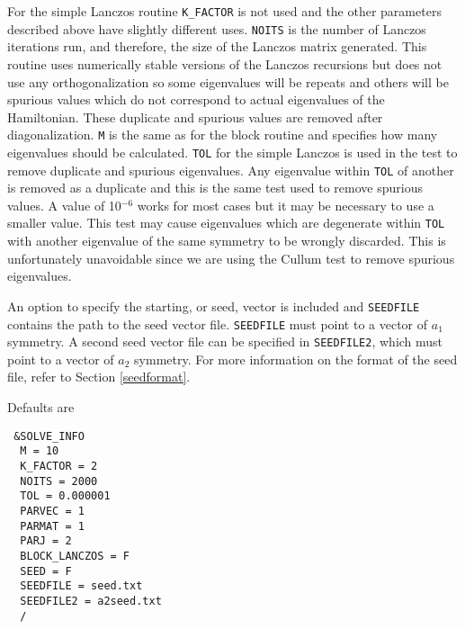 \documentclass{article}
\begin{document}
For the simple Lanczos routine {\tt K\_FACTOR} is not used and the other parameters described above
have slightly different uses. {\tt NOITS} is the number of Lanczos iterations run, and therefore, the
size of the Lanczos matrix generated. This routine uses numerically stable versions of the Lanczos recursions\cite{cullum} but does not use any orthogonalization so some
eigenvalues will be repeats and others will be spurious values which do not correspond to actual
eigenvalues of the Hamiltonian. These duplicate and spurious values are removed after diagonalization. {\tt M} is the same as for the block routine and specifies how many eigenvalues should be calculated. {\tt TOL} for the simple Lanczos is used
in the test to remove duplicate and spurious eigenvalues. Any eigenvalue within {\tt TOL} of another
is removed as a duplicate and this is the same test used to remove spurious values. A value
of 10$^{-6}$ works for most cases but it may be necessary to use a smaller value. This test may cause eigenvalues which are degenerate within {\tt TOL} with another eigenvalue of the same symmetry to be wrongly discarded. This is unfortunately unavoidable since we are using the Cullum test to remove spurious eigenvalues.

An option to specify the starting, or seed, vector is included and \texttt{SEEDFILE} contains the path to the seed vector file. \texttt{SEEDFILE} must point to a vector of $a_1$ symmetry. A second seed vector file can be specified in \texttt{SEEDFILE2}, which must point to a vector of $a_2$ symmetry. For more information on the format of the seed file, refer to Section \ref{seedformat}.

Defaults are

\begin{verbatim}
 &SOLVE_INFO
  M = 10
  K_FACTOR = 2
  NOITS = 2000
  TOL = 0.000001
  PARVEC = 1
  PARMAT = 1
  PARJ = 2
  BLOCK_LANCZOS = F
  SEED = F
  SEEDFILE = seed.txt
  SEEDFILE2 = a2seed.txt
  /
\end{verbatim}
\end{document}
